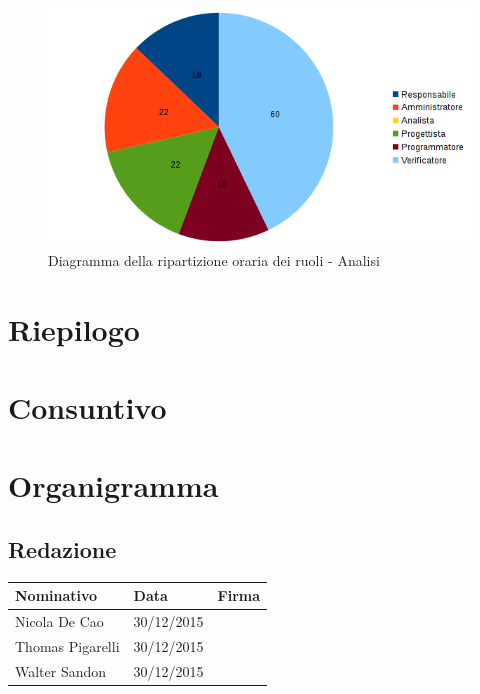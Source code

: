 \documentclass[12pt,a4paper]{article}
\begin{document}
\begin{center}
\begin{figure}[H]
\centering
\includegraphics[width=\textwidth]{diagrammaTortaVerificaValidazioneTotaleOre.png}
\caption{Diagramma della ripartizione oraria dei ruoli - Analisi}
\end{figure}
\end{center}

\newpage

\section{Riepilogo}

\newpage

\section{Consuntivo}

\newpage

\appendix
\section{Organigramma}

\subsection{Redazione}

\begin{tabular}{| l | l | l |}
    \hline
    Nominativo & Data & Firma \\ \hline
    Nicola De Cao & 30/12/2015 & \\ \hline
    Thomas Pigarelli & 30/12/2015 & \\ \hline
    Walter Sandon & 30/12/2015 & \\ \hline
\end{tabular}
\end{document}
